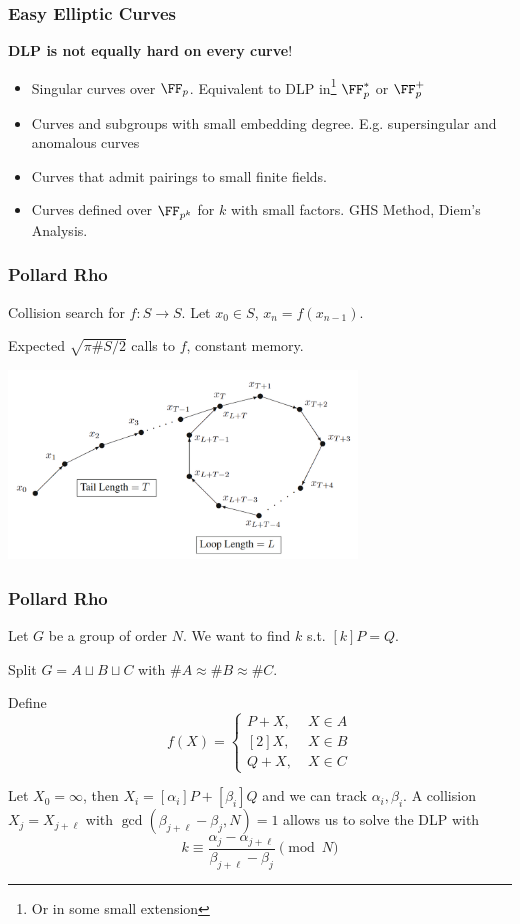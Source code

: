 \documentclass{beamer}
\begin{document}
\begin{frame}
    \frametitle{Easy Elliptic Curves}
    \textbf{DLP is not equally hard on every curve}!
    \begin{itemize}
        \item Singular curves over $\FF_p$. Equivalent to DLP in\footnote{Or in some small extension} $\FF_p^*$ or $\FF_p^+$
        \item Curves and subgroups with small embedding degree. E.g. supersingular and anomalous curves
        \item Curves that admit pairings to small finite fields.
        \item Curves defined over $\FF_{p^k}$ for $k$ with small factors. GHS Method, Diem's Analysis.
    \end{itemize}
\end{frame}

\begin{frame}
    \frametitle{Pollard Rho}
    Collision search for $f: S \to S$. Let $x_0 \in S$, $x_n = f(x_{n-1})$.
    
    Expected $\sqrt{\pi \#S/2}$ calls to $f$, constant memory.
    
    \begin{center}
        \includegraphics[width=25em]{pollard_rho.PNG}
    \end{center}
\end{frame}

\begin{frame}
    \frametitle{Pollard Rho}
    Let $G$ be a group of order $N$. We want to find $k$ s.t. $[k]P = Q$.
    
    Split $G = A \sqcup B \sqcup C$ with $\# A \approx \# B \approx \#C$.
    
    Define 
    \[ f(X) = \begin{cases}
        P + X, \; &X \in A \\
        [2]X, \; &X \in B \\
        Q + X, \; &X \in C
    \end{cases} \]
    
    Let $X_0 = \infty$, then $X_i = [\alpha_i] P + [\beta_i] Q$ and we can track $\alpha_i, \beta_i$. 
    A collision $X_j = X_{j+\ell}$ with $\gcd(\beta_{j+\ell} - \beta_j, N) = 1$ allows us to solve the DLP with
    \[ k \equiv \frac{\alpha_j - \alpha_{j + \ell}}{\beta_{j+\ell} - \beta_j} \pmod{N} \]

\end{frame}
\end{document}
